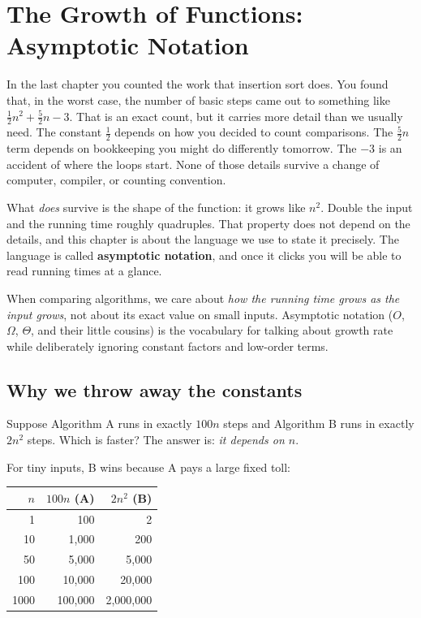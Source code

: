\chapter{The Growth of Functions: Asymptotic Notation}

In the last chapter you counted the work that insertion sort does. You found
that, in the worst case, the number of basic steps came out to something like
$\frac{1}{2}n^2 + \frac{5}{2}n - 3$. That is an exact count, but it
carries more detail than we usually need. The constant $\frac12$
depends on how you decided to count comparisons. The $\frac52 n$ term depends on
bookkeeping you might do differently tomorrow. The $-3$ is an accident of where
the loops start. None of those details survive a change of computer, compiler,
or counting convention.

What \emph{does} survive is the shape of the function: it grows like $n^2$. Double
the input and the running time roughly quadruples. That property does not
depend on the details, and this chapter is about the language we use to state it
precisely. The language is called \textbf{asymptotic notation}, and once it clicks
you will be able to read running times at a glance.

\begin{focusbox}
When comparing algorithms, we care about
\emph{how the running time grows as the input grows}, not about its exact value
on small inputs. Asymptotic notation ($O$, $\Omega$, $\Theta$, and their little
cousins) is the vocabulary for talking about growth rate while deliberately
ignoring constant factors and low-order terms.
\end{focusbox}

\section{Why we throw away the constants}

Suppose Algorithm A runs in exactly $100n$ steps and Algorithm B runs in exactly
$2n^2$ steps. Which is faster? The answer is: \emph{it depends on $n$}.

For tiny inputs, B wins because A pays a large fixed toll:

\begin{center}
\begin{tabular}{rrr}
\toprule
$n$ & $100n$ (A) & $2n^2$ (B) \\
\midrule
1    & 100      & 2 \\
10   & 1{,}000  & 200 \\
50   & 5{,}000  & 5{,}000 \\
100  & 10{,}000 & 20{,}000 \\
1000 & 100{,}000 & 2{,}000{,}000 \\
\bottomrule
\end{tabular}
\end{center}

